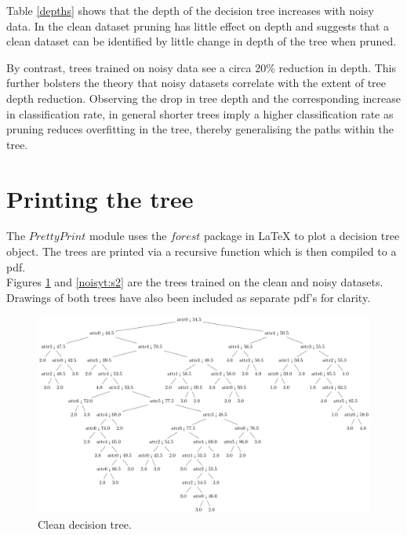 \documentclass{article}
\begin{document}
Table \ref{depths} shows that the depth of the decision tree increases with noisy data. In the clean dataset pruning has little effect on depth and suggests that a clean dataset can be identified by little change in depth of the tree when pruned.

By contrast, trees trained on noisy data see a circa 20\% reduction in depth. This further bolsters the theory that noisy datasets correlate with the extent of tree depth reduction. Observing the drop in tree depth and the corresponding increase in classification rate, in general shorter trees imply a higher classification rate as pruning reduces overfitting in the tree, thereby generalising the paths within the tree.



\section{Printing the tree}
The $PrettyPrint$ module uses the $forest$ package in LaTeX to plot a decision tree object. The trees are printed via a recursive function which is then compiled to a pdf.
\\
Figures \ref{cleant:s2} and \ref{noisyt:s2} are the trees trained on the clean and noisy datasets.
\\
Drawings of both trees have also been included as separate pdf's for clarity.

\begin{figure}
\centering
\includegraphics[width=\textwidth,height=\textheight,keepaspectratio]{figures/clean_tree.png}
\caption{ Clean decision tree. }
\label{cleant:s2}
\end{figure}

\vspace{\floatsep}
\end{document}
